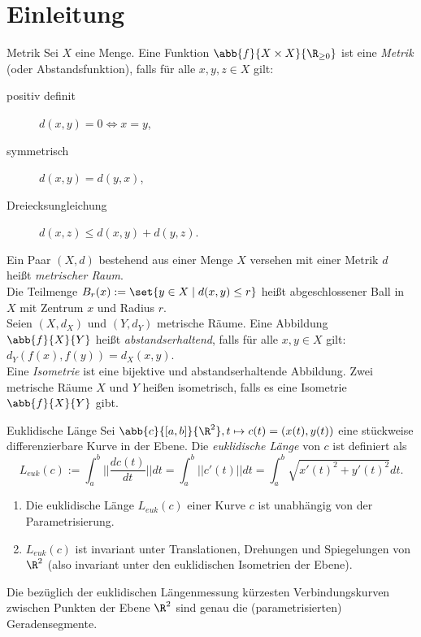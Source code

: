 \setcounter{section}{1}
\section{Einleitung}

\begin{karte}{Metrik}
    Sei \(X\) eine Menge. Eine Funktion \(\abb{f}{X\times X}{\R_{\geq 0}}\) ist eine \textit{Metrik} 
    (oder Abstandsfunktion), falls für alle \(x,y,z\in X\) gilt: 
    \begin{description}
        \item[positiv definit] \(d(x,y) = 0 \Leftrightarrow x = y\),
        \item[symmetrisch] \(d(x,y) = d(y,x)\),
        \item[Dreiecksungleichung] \(d(x,z) \leq d(x,y) + d(y,z)\).   
    \end{description}
    Ein Paar \((X,d)\) bestehend aus einer Menge \(X\) versehen mit einer Metrik \(d\) heißt 
    \textit{metrischer Raum}.\\
    Die Teilmenge \(B_r(x) := \set{y\in X \;|\; d(x,y) \leq r}\) heißt abgeschlossener Ball in \(X\) 
    mit Zentrum \(x\) und Radius \(r\).\\
    Seien \((X,d_X)\) und \((Y,d_Y)\) metrische Räume. Eine Abbildung \(\abb{f}{X}{Y}\) heißt 
    \textit{abstandserhaltend}, falls für alle \(x,y\in X\) gilt: \(d_Y(f(x), f(y)) = d_X(x,y)\).\\
    Eine \textit{Isometrie} ist eine bijektive und abstandserhaltende Abbildung. Zwei metrische 
    Räume \(X\) und \(Y\) heißen isometrisch, falls es eine Isometrie \(\abb{f}{X}{Y}\) gibt.
\end{karte}

\begin{karte}{Euklidische Länge}
    Sei \(\abb{c}{[a,b]}{\R^2}, t\mapsto c(t) = (x(t),y(t))\) eine stückweise differenzierbare Kurve in 
    der Ebene. Die \textit{euklidische Länge} von \(c\) ist definiert als 
    \[ L_{euk}(c) := \int_a^b ||\frac{dc(t)}{dt}||dt = \int_a^b ||c'(t)||dt = \int_a^b \sqrt{x'(t)^2 + y'(t)^2} dt. \]

    \begin{enumerate}
        \item Die euklidische Länge \(L_{euk}(c)\) einer Kurve \(c\) ist unabhängig von der Parametrisierung.
        \item \(L_{euk}(c)\) ist invariant unter Translationen, Drehungen und Spiegelungen von \(\R^2\) 
        (also invariant unter den euklidischen Isometrien der Ebene).
    \end{enumerate}
    Die bezüglich der euklidischen Längenmessung kürzesten Verbindungskurven zwischen Punkten der Ebene 
    \(\R^2\) sind genau die (parametrisierten) Geradensegmente.
\end{karte}

